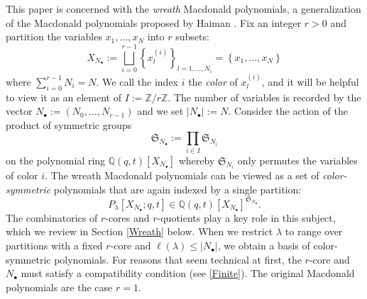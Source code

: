 \documentclass{amsart}
\newcommand{\Z}{\mathbb{Z}}
\newcommand{\Q}{\mathbb{Q}}
\newcommand{\Sym}{\mathfrak{S}}
\theoremstyle{remark}
\numberwithin{thm}{section}
\numberwithin{equation}{section}
\begin{document}
This paper is concerned with the \textit{wreath} Macdonald polynomials, a generalization of the Macdonald polynomials proposed by Haiman \cite{H2}.
Fix an integer $r>0$ and partition the variables $x_1,\ldots, x_N$ into $r$ subsets:
\[
X_{N_\bullet}:=\bigsqcup_{i=0}^{r-1}\left\{x^{(i)}_{l}\right\}_{l=1,\ldots, N_i}=\left\{ x_1,\ldots,x_N \right\}
\]
where $\sum_{i=0}^{r-1}N_i=N$.
We call the index $i$ the \textit{color} of $x^{(i)}_{l}$, and it will be helpful to view it as an element of $I:=\Z/r\Z$.
The number of variables is recorded by the vector $N_\bullet :=(N_0,\ldots, N_{r-1})$ and we set $|N_\bullet|:=N$.
Consider the action of the product of symmetric groups
\[
\Sym_{N_\bullet}:=\prod_{i\in I}\Sym_{N_i}
\]
on the polynomial ring $\Q(q,t)\left[ X_{N_\bullet} \right]$ whereby $\Sym_{N_i}$ only permutes the variables of color $i$.
The wreath Macdonald polynomials can be viewed as a set of \textit{color-symmetric} polynomials that are again indexed by a single partition:
\[
P_\lambda[X_{N_\bullet};q,t]\in\Q(q,t)\left[ X_{N_\bullet} \right]^{\Sym_{N_\bullet}}.
\]
The combinatorics of $r$-cores and $r$-quotients play a key role in this subject, which we review in Section \ref{Wreath} below.
When we restrict $\lambda$ to range over partitions with a fixed $r$-core and $\ell(\lambda)\le |N_\bullet|$, we obtain a basis of color-symmetric polynomials.
For reasons that seem technical at first, the $r$-core and $N_\bullet$ must satisfy a compatibility condition (see \ref{Finite}). 
The original Macdonald polynomials are the case $r=1$.
\end{document}
